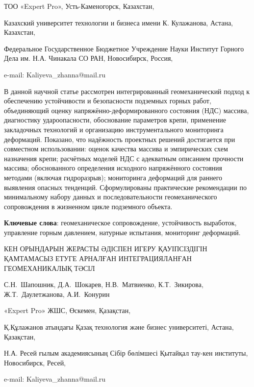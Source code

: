 \begin{affil}
ТОО «Expert Pro», Усть-Каменогорск, Казахстан,

Казахский университет технологии и бизнеса имени К. Кулажанова, Астана, Казахстан,

Федеральное Государственное Бюджетное Учреждение Науки Институт Горного Дела им. Н.А. Чинакала СО РАН, Новосибирск, Россия,

e-mail: Kaliyeva\_zhanna@mail.ru
\end{affil}

В данной научной статье рассмотрен интегрированный геомеханический
подход к обеспечению устойчивости и безопасности подземных горных работ,
объединяющий оценку напряжённо-деформированного состояния (НДС) массива,
диагностику удароопасности, обоснование параметров крепи, применение
закладочных технологий и организацию инструментального мониторинга
деформаций. Показано, что надёжность проектных решений достигается при
совместном использовании: оценок качества массива и эмпирических схем
назначения крепи; расчётных моделей НДС с адекватным описанием прочности
массива; обоснованного определения исходного напряжённого состояния
методами (включая гидроразрыв); мониторинга деформаций для раннего
выявления опасных тенденций. Сформулированы практические рекомендации по
минимальному набору данных и последовательности геомеханического
сопровождения в жизненном цикле подземного объекта.

{\bfseries Ключевые слова}: геомеханическое сопровождение, устойчивость
выработок, управление горным давлением, натурные испытания, мониторинг
деформаций.

\begin{header}
КЕН ОРЫНДАРЫН ЖЕРАСТЫ ӘДІСПЕН ИГЕРУ ҚАУІПСІЗДІГІН ҚАМТАМАСЫЗ ЕТУГЕ АРНАЛҒАН ИНТЕГРАЦИЯЛАНҒАН ГЕОМЕХАНИКАЛЫҚ ТӘСІЛ

С.Н.~Шапошник,
Д.А.~Шокарев,
Н.В.~Матвиенко,
К.Т.~Зикирова,
Ж.Т.~Даулетжанова\envelope,
А.И.~Конурин
\end{header}

\begin{affil}
«Expert Pro» ЖШС, Өскемен, Қазақстан,

Қ.Құлажанов атындағы Қазақ технология және бизнес университеті, Астана, Қазақстан,

Н.А. Ресей ғылым академиясының Сібір бөлімшесі Қытайқал тау-кен институты, Новосибирск, Ресей,

e-mail: Kaliyeva\_zhanna@mail.ru
\end{affil}

